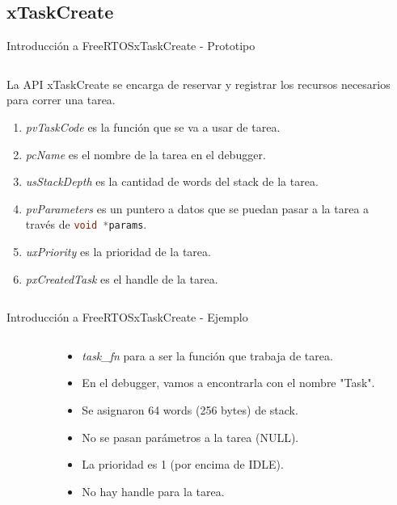 \documentclass[aspectratio=169, xcolor=dvipsnames]{beamer}
\begin{document}
\subsection{xTaskCreate}
\begin{frame}{Introducción a FreeRTOS}{xTaskCreate - Prototipo}
\begin{columns}
\begin{column}{0.65\textwidth}
La API \textcolor{myblue}{xTaskCreate} se encarga de reservar y registrar los recursos necesarios para correr una tarea.\newline
\begin{enumerate}
    \item \textit{pvTaskCode} es la función que se va a usar de tarea.
    \item \textit{pcName} es el nombre de la tarea en el debugger.
    \item \textit{usStackDepth} es la cantidad de words del stack de la tarea.
    \item \textit{pvParameters} es un puntero a datos que se puedan pasar a la tarea a través de \lstinline[language=c]{void *params}.
    \item \textit{uxPriority} es la prioridad de la tarea.
    \item \textit{pxCreatedTask} es el handle de la tarea.
\end{enumerate}
\end{column}
\begin{column}{0.35\textwidth}

\end{column}
\end{columns}
\end{frame}

\begin{frame}{Introducción a FreeRTOS}{xTaskCreate - Ejemplo}
\begin{columns}
\begin{column}{0.35\textwidth}

\end{column}
\begin{column}{0.65\textwidth}
\begin{itemize}
    \item \textit{task\_fn} para a ser la función que trabaja de tarea.
    \item En el debugger, vamos a encontrarla con el nombre "Task".
    \item Se asignaron 64 words (256 bytes) de stack.
    \item No se pasan parámetros a la tarea (NULL).
    \item La prioridad es 1 (por encima de IDLE).
    \item No hay handle para la tarea.
\end{itemize}
\end{column}
\end{columns}
\end{frame}
\end{document}
